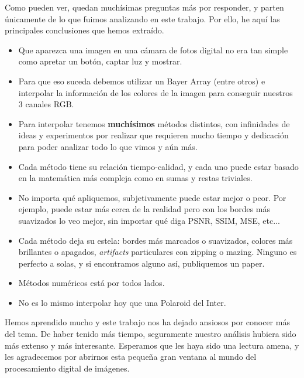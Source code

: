Como pueden ver, quedan muchísimas preguntas más por responder, y parten únicamente de lo que fuimos analizando en este trabajo. Por ello, he aquí las principales conclusiones que hemos extraído. 

\vspace{\baselineskip}

\begin{itemize}
\item Que aparezca una imagen en una cámara de fotos digital no era tan simple como apretar un botón, captar luz y mostrar.
\item Para que eso suceda debemos utilizar un Bayer Array (entre otros) e interpolar la información de los colores de la imagen para conseguir nuestros 3 canales RGB.
\item Para interpolar tenemos \textbf{muchísimos} métodos distintos, con infinidades de ideas y experimentos por realizar que requieren mucho tiempo y dedicación para poder analizar todo lo que vimos y aún más.
\item Cada método tiene su relación tiempo-calidad, y cada uno puede estar basado en la matemática más compleja como en sumas y restas triviales.
\item No importa qué apliquemos, subjetivamente puede estar mejor o peor. Por ejemplo, puede estar más cerca de la realidad pero con los bordes más suavizados lo veo mejor, sin importar qué diga PSNR, SSIM, MSE, etc...
\item Cada método deja su estela: bordes más marcados o suavizados, colores más brillantes o apagados, \textit{artifacts} particulares con zipping o mazing. Ninguno es perfecto a solas, y si encontramos alguno así, publiquemos un paper.
\item Métodos numéricos está por todos lados.
\item No es lo mismo interpolar hoy que una Polaroid del Inter.
\end{itemize}

Hemos aprendido mucho y este trabajo nos ha dejado ansiosos por conocer más del tema. De haber tenido más tiempo, seguramente nuestro análisis hubiera sido más extenso y más interesante. Esperamos que les haya sido una lectura amena, y les agradecemos por abrirnos esta pequeña gran ventana al mundo del procesamiento digital de imágenes.

